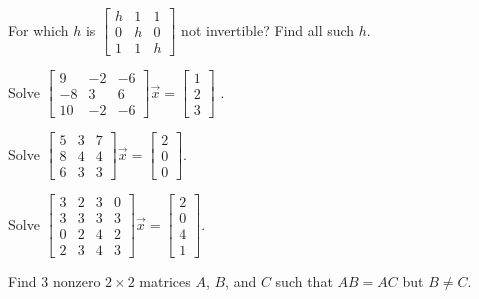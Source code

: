\begin{exercise}
For which $h$ is
$\left[ \begin{smallmatrix}
h & 1 & 1 \\
0 & h & 0 \\
1 & 1 & h
\end{smallmatrix} \right]$
not invertible?  Find all such $h$.
\end{exercise}

\begin{exercise}
Solve
$\left[ \begin{smallmatrix}
9 & -2 & -6 \\
-8 & 3 & 6 \\
10 & -2 & -6
\end{smallmatrix} \right] \vec{x} =
\left[ \begin{smallmatrix}
1 \\
2 \\
3
\end{smallmatrix} \right]$ .
\end{exercise}

\begin{exercise}
Solve
$\left[ \begin{smallmatrix}
5 & 3 & 7 \\
8 & 4 & 4 \\
6 & 3 & 3
\end{smallmatrix} \right] \vec{x} =
\left[ \begin{smallmatrix}
2 \\
0 \\
0
\end{smallmatrix} \right]$.
\end{exercise}

\begin{exercise}
Solve
$\left[ \begin{smallmatrix}
3 & 2 & 3 & 0 \\
3 & 3 & 3 & 3 \\
0 & 2 & 4 & 2 \\
2 & 3 & 4 & 3 
\end{smallmatrix} \right] \vec{x} =
\left[ \begin{smallmatrix}
2 \\
0 \\
4 \\
1
\end{smallmatrix} \right]$.
\end{exercise}

\begin{exercise}
Find 3 nonzero $2 \times 2$ matrices $A$, $B$, and $C$ such that
$AB = AC$ but $B \not= C$.
\end{exercise}

